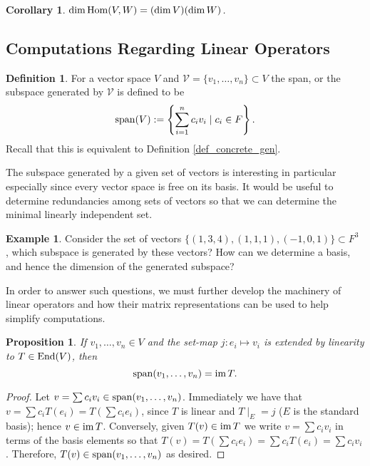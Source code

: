 \documentclass[12pt]{article}
\theoremstyle{definition}
\newtheorem{definition}{Definition}[section]
\newtheorem{example}{Example}[section]
\theoremstyle{plain}
\newtheorem{proposition}[theorem] {Proposition}
\newtheorem{corollary}[theorem]{Corollary}
\numberwithin{equation}{section}
\theoremstyle{definition}
\begin{document}
\begin{corollary} \label{hom_dim}
$ \dim \operatorname{Hom}(V, W) = (\dim V) (\dim W) $.
\end{corollary}

\subsection{Computations Regarding Linear Operators}

\begin{definition}
For a vector space $ V $ and $ \mathcal{V} = \{v_1, \ldots, v_n\} \subset V$ the span, or the subspace generated by $ \mathcal{V} $ is defined to be
\[ \operatorname{span} (V) := \left \{ \sum_{i = 1}^n c_i v_i \mid c_i \in F \right \}.\]
Recall that this is equivalent to Definition \ref{def_concrete_gen}.
\end{definition}

The subspace generated by a given set of vectors is interesting in particular especially since every vector space is free on its basis. It would be useful to determine redundancies among sets of vectors so that we can determine the minimal linearly independent set. 

\begin{example}
Consider the set of vectors $ \{ (1, 3, 4), (1, 1, 1), (-1, 0, 1) \} \subset F^3$ , which subspace is generated by these vectors? How can we determine a basis, and hence the dimension of the generated subspace?
\end{example}

In order to answer such questions, we must further develop the machinery of linear operators and how their matrix representations can be used to help simplify computations.

\begin{proposition}
If $ v_1, \ldots, v_n \in V $ and the set-map $ j: e_i \mapsto v_i $ is extended by linearity to $ T \in \operatorname{End}(V) $, then
\[ \operatorname{span}(v_1, \ldots, v_n) = \operatorname{im} T. \]
\end{proposition}

\begin{proof}
Let $ v = \sum c_i v_i \in \operatorname{span}(v_1, \ldots, v_n) $. Immediately we have that $ v = \sum c_i T(e_i) = T(\sum c_i e_i) $, since $ T $ is linear and $ T \mid_E = j $ ($ E $ is the standard basis); hence $ v \in \operatorname{im} T $. Conversely, given $ T(v) \in \operatorname{im} T $ we write $ v = \sum c_i v_i $ in terms of the basis elements so that $ T(v) = T(\sum c_i e_i) = \sum c_i T(e_i) = \sum c_i v_i $. Therefore, $ T(v) \in \operatorname{span}(v_1, \ldots, v_n) $ as desired.
\end{proof}
\end{document}
